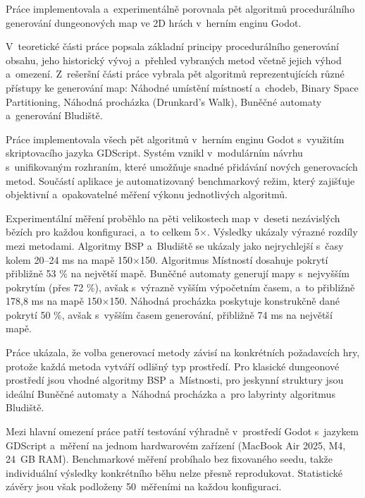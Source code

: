 \documentclass[
   program=itk,
   biblatex,
   figures=true,
   tables=true,
   glossaries,
   index
]{kidiplom}
\begin{document}
\begin{kiconclusions}
Práce implementovala a~experimentálně porovnala pět algoritmů procedurálního generování dungeonových map ve 2D hrách v~herním enginu Godot.

V~teoretické části práce popsala základní principy procedurálního generování obsahu, jeho historický vývoj a~přehled vybraných metod včetně jejich výhod a~omezení. Z~rešeršní části práce vybrala pět algoritmů reprezentujících různé přístupy ke generování map: Náhodné umístění místností a~chodeb, Binary Space Partitioning, Náhodná procházka (Drunkard's Walk), Buněčné automaty a~generování Bludiště.

Práce implementovala všech pět algoritmů v~herním enginu Godot s~využitím skriptovacího jazyka GDScript. Systém vznikl v~modulárním návrhu s~unifikovaným rozhraním, které umožňuje snadné přidávání nových generovacích metod. Součástí aplikace je automatizovaný benchmarkový režim, který zajišťuje objektivní a~opakovatelné měření výkonu jednotlivých algoritmů.

Experimentální měření proběhlo na pěti velikostech map v~deseti nezávislých bězích pro každou konfiguraci, a~to celkem 5$\times$. Výsledky ukázaly výrazné rozdíly mezi metodami. Algoritmy BSP a~Bludiště se ukázaly jako nejrychlejší s~časy kolem 20--24 ms na mapě 150$\times$150. Algoritmus Místností dosahuje pokrytí přibližně 53 \% na největší mapě. Buněčné automaty generují mapy s~nejvyšším pokrytím (přes 72 \%), avšak s~výrazně vyšším výpočetním časem, a~to přibližně 178,8 ms na mapě 150$\times$150. Náhodná procházka poskytuje konstrukčně dané pokrytí 50 \%, avšak s~vyšším časem generování, přibližně 74 ms na největší mapě.

Práce ukázala, že volba generovací metody závisí na konkrétních požadavcích hry, protože každá metoda vytváří odlišný typ prostředí. Pro klasické dungeonové prostředí jsou vhodné algoritmy BSP a~Místnosti, pro jeskynní struktury jsou ideální Buněčné automaty a~Náhodná procházka a~pro labyrinty algoritmus Bludiště.

Mezi hlavní omezení práce patří testování výhradně v~prostředí Godot s~jazykem GDScript a~měření na jednom hardwarovém zařízení (MacBook Air 2025, M4, 24~GB RAM). Benchmarkové měření probíhalo bez fixovaného seedu, takže individuální výsledky konkrétního běhu nelze přesně reprodukovat. Statistické závěry jsou však podloženy 50~měřeními na každou konfiguraci.
\end{kiconclusions}
\end{document}
